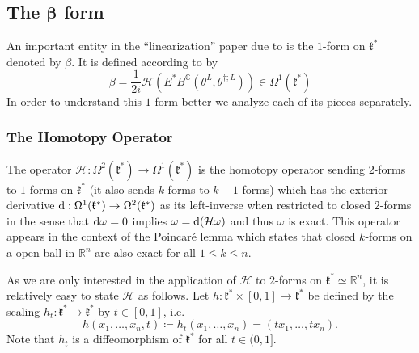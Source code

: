 \documentclass[notitlepage]{article}
\begin{document}
\subsection{The \texorpdfstring{$\boldsymbol{\beta}$}{beta} form}

An important entity in the ``linearization'' paper due to \citeauthor{alekseev2001linearization} \cite{alekseev2001linearization} is the $1$-form on $\mathfrak k^{*}$ denoted by $\beta$.
It is defined according to \cite[Equation (8)]{alekseev2001linearization} by
\begin{equation}
    \beta = \frac{1}{2i} \mathcal H \left(E^{*} B^{\mathbb C}(\theta^{L}, \theta^{\dagger;L})   \right) \in \Omega^{1}(\mathfrak k^{*})
\end{equation}
In order to understand this $1$-form better we analyze each of its pieces separately.

\subsubsection{The Homotopy Operator}

The operator $\mathcal H : \Omega^{2}(\mathfrak k^{*}) \to \Omega^{1}(\mathfrak k^{*})$ is the homotopy operator sending $2$-forms to $1$-forms on $\mathfrak k^{*}$ (it also sends $k$-forms to $k-1$ forms) which has the exterior derivative $\mathrm{d} : \Omega^{1}(\mathfrak k^{*}) \to \Omega^{2}(\mathfrak k^{*})$ as its left-inverse when restricted to closed $2$-forms in the sense that $\mathrm{d} \omega = 0$ implies $\omega = \mathrm{d} (\mathcal H \omega)$ and thus $\omega$ is exact.
This operator appears in the context of the Poincaré lemma which states that closed $k$-forms on a open ball in $\mathbb R^{n}$ are also exact for all $1 \leq k \leq n$.

As we are only interested in the application of $\mathcal H$ to $2$-forms on $\mathfrak k^{*} \simeq \mathbb R^{n}$, it is relatively easy to state $\mathcal H$ as follows.
Let $h : \mathfrak k^{*} \times [0,1] \to \mathfrak k^{*}$ be defined by the scaling $h_t : \mathfrak k^{*} \to \mathfrak k^{*}$ by $t \in [0,1]$, i.e.
\begin{equation}
    h(x_1, \ldots, x_n, t) \coloneqq h_t(x_1, \ldots, x_n) = (tx_1, \ldots, tx_n).
\end{equation}
Note that $h_t$ is a diffeomorphism of $\mathfrak k^{*}$ for all $t \in (0,1]$.
\end{document}
